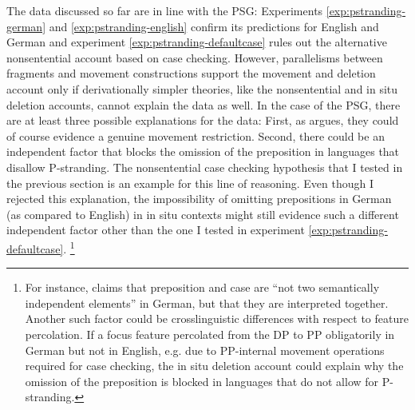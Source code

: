 The data discussed so far are in line with the PSG: Experiments \ref{exp:pstranding-german} and \ref{exp:pstranding-english} confirm its predictions for English and German and experiment \ref{exp:pstranding-defaultcase} rules out the alternative nonsentential account based on case checking. However, parallelisms between fragments and movement constructions support the movement and deletion account only if derivationally simpler theories, like the nonsentential and in situ deletion accounts, cannot explain the data as well. In the case of the PSG, there are at least three possible explanations for the data: First, as \citet{merchant2004} argues, they could of course evidence a genuine movement restriction. Second, there could be an independent factor that blocks the omission of the preposition in languages that disallow P-stranding. The nonsentential case checking hypothesis that I tested in the previous section is an example for this line of reasoning. Even though I rejected this explanation, the impossibility of omitting prepositions in German (as compared to English) in in situ contexts might still evidence such a different independent factor other than the one I tested in experiment \ref{exp:pstranding-defaultcase}.%
%
\footnote{For instance, \citet[21]{zwarts2005} claims that preposition and case are ``not two semantically independent elements'' in German, but that they are interpreted together. Another such factor could be crosslinguistic differences with respect to feature percolation. If a focus feature percolated from the DP to PP obligatorily in German but not in English, e.g. due to PP-internal movement operations required for case checking, the in situ deletion account could explain why the omission of the preposition is blocked in languages that do not allow for P-stranding.}\afterfn%
% 

